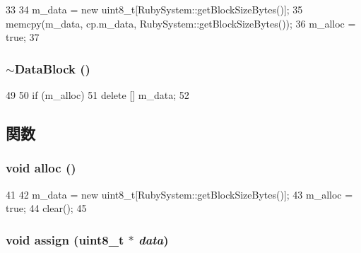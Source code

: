 \begin{DoxyCode}
33 {
34     m_data = new uint8_t[RubySystem::getBlockSizeBytes()];
35     memcpy(m_data, cp.m_data, RubySystem::getBlockSizeBytes());
36     m_alloc = true;
37 }
\end{DoxyCode}
\hypertarget{classDataBlock_a7bf0fa5f818d574e5d4d42b6a3f9e5f0}{
\subsubsection[{$\sim$DataBlock}]{\setlength{\rightskip}{0pt plus 5cm}$\sim${\bf DataBlock} ()}}
\label{classDataBlock_a7bf0fa5f818d574e5d4d42b6a3f9e5f0}



\begin{DoxyCode}
49     {
50         if (m_alloc)
51             delete [] m_data;
52     }
\end{DoxyCode}


\subsection{関数}
\hypertarget{classDataBlock_a84da126492aa15ed1e0a848026779237}{
\subsubsection[{alloc}]{\setlength{\rightskip}{0pt plus 5cm}void alloc ()}}
\label{classDataBlock_a84da126492aa15ed1e0a848026779237}



\begin{DoxyCode}
41 {
42     m_data = new uint8_t[RubySystem::getBlockSizeBytes()];
43     m_alloc = true;
44     clear();
45 }
\end{DoxyCode}
\hypertarget{classDataBlock_a5f8b82315ac0fe6c029cea2ab249024a}{
\subsubsection[{assign}]{\setlength{\rightskip}{0pt plus 5cm}void assign (uint8\_\-t $\ast$ {\em data})}}
\label{classDataBlock_a5f8b82315ac0fe6c029cea2ab249024a}




